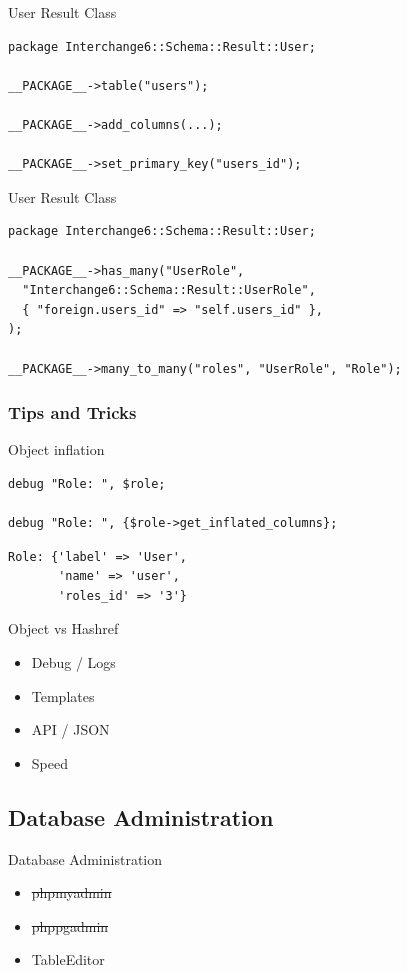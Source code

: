 \begin{frame}[fragile]{User Result Class}
\begin{lstlisting}
package Interchange6::Schema::Result::User;

__PACKAGE__->table("users");

__PACKAGE__->add_columns(...);

__PACKAGE__->set_primary_key("users_id");

\end{lstlisting}
\end{frame}


\begin{frame}[fragile]{User Result Class}
\begin{lstlisting}
package Interchange6::Schema::Result::User;

__PACKAGE__->has_many("UserRole",
  "Interchange6::Schema::Result::UserRole",
  { "foreign.users_id" => "self.users_id" },
);

__PACKAGE__->many_to_many("roles", "UserRole", "Role");
\end{lstlisting}
\end{frame}

\subsubsection{Tips and Tricks}

\begin{frame}[fragile]{Object inflation}
\begin{lstlisting}
debug "Role: ", $role;

debug "Role: ", {$role->get_inflated_columns};
\end{lstlisting}
\begin{lstlisting}
Role: {'label' => 'User',
       'name' => 'user',
       'roles_id' => '3'} 
\end{lstlisting}
\end{frame}

\begin{frame}{Object vs Hashref}
\begin{itemize}
\item Debug / Logs
\item Templates
\item API / JSON
\item Speed
\end{itemize}
\end{frame}


\subsection{Database Administration}
\begin{frame}{Database Administration}
\begin{itemize}
\item \sout{phpmyadmin}
\item \sout{phppgadmin}
\item TableEditor
\end{itemize}
\end{frame}

